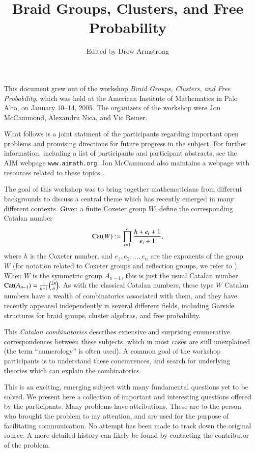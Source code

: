 \documentclass[12pt,letterpaper, reqno]{aimpl}
\newcommand{\Cat}{{\rm Cat}}
\begin{document}
\title{Braid Groups, Clusters, and Free Probability}
\author{Edited by Drew Armstrong}


\maketitle

This document grew out of the workshop \emph{Braid Groups, Clusters,
and Free Probability}, which was held at the American Institute of
Mathematics in Palo Alto, on January 10--14, 2005. The organizers of
the workshop were Jon McCammond, Alexandru Nica, and Vic Reiner.

What follows is a joint statment of the participants regarding important
open problems and promising directions for future progress in the
subject. For further information, including a list of participants and
participant abstracts, see the AIM webpage \texttt{www.aimath.org}. Jon
McCammond also maintains a webpage with resources related to these
topics \cite{mccammond:webpage}.

The goal of this workshop was to bring together mathematicians from
different backgrounds to discuss a central theme which has recently
emerged in many different contexts.  Given a finite Coxeter group $W$,
define the corresponding Catalan number
\begin{equation*}
\Cat(W):=\prod_{i=1}^n \frac{h+e_i+1}{e_i+1},
\end{equation*}
where $h$ is the Coxeter number, and $e_1,e_2,\ldots,e_n$ are the
exponents of the group $W$ (for notation related to Coxeter groups
and reflection groups, we refer to \cite{humphries}). When $W$ is
the symmetric group $A_{n-1}$, this is just the usual Catalan number
$\Cat(A_{n-1})=\frac{1}{n+1}\binom{2n}{n}$. As with the classical Catalan
numbers, these type $W$ Catalan numbers have a wealth of combinatorics
associated with them, and they have recently appeared independently in
several different fields, including Garside structures for braid groups,
cluster algebras, and free probability.

This \emph{Catalan combinatorics} describes extensive and surprising
enumerative correspondences between these subjects, which in most cases
are still unexplained (the term ``numerology'' is often used). A common
goal of the workshop participants is to understand these concurrences,
and search for underlying theories which can explain the combinatorics.

This is an exciting, emerging subject with many fundamental questions
yet to be solved. We present here a collection of important and
interesting questions offered by the participants. Many problems have
attributions. These are to the person who brought the problem to my
attention, and are used for the purpose of facilitating communication. No
attempt has been made to track down the original source. A more detailed
history can likely be found by contacting the contributor of the problem.
\end{document}
